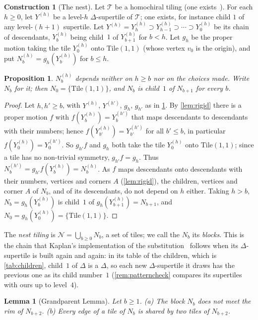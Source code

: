 \documentclass[11pt]{amsart}
\newtheorem{lemma}[theorem]{Lemma}
\newtheorem{proposition}[theorem]{Proposition}
\theoremstyle{definition}
\newtheorem{construction}[theorem]{Construction}
\theoremstyle{remark}
\newcommand{\Tile}{\mathrm{Tile}(1,1)}
\newcommand{\T}{\mathcal T}
\newcommand{\N}{\mathcal N}
\begin{document}
\begin{construction}[The nest]\label{con:nest}
Let $\T$ be a homochiral tiling (one exists~\cite[Thm.~2.2]{SMKGS-spectre}). For each $h\ge0$, let $Y^{(h)}$ be a
level-$h$ $\Delta$-supertile of $\T$; one exists, for instance child $1$ of any level-$(h+1)$ supertile. Let
$Y^{(h)}=Y^{(h)}_h\supset Y^{(h)}_{h-1}\supset\cdots\supset Y^{(h)}_0$ be its chain of descendants, $Y^{(h)}_b$ being
child~$1$ of $Y^{(h)}_{b+1}$ for $b<h$. Let $g_h$ be the proper motion taking the tile $Y^{(h)}_0$ onto $\Tile$ (whose
vertex $v_0$ is the origin), and put $N^{(h)}_b=g_h(Y^{(h)}_b)$ for $b\le h$.
\end{construction}

\begin{proposition}\label{prop:nestwell}
$N^{(h)}_b$ depends neither on $h\ge b$ nor on the choices made. Write $N_b$ for it; then $N_0=\{\Tile\}$, and $N_b$ is
child~$1$ of $N_{b+1}$ for every $b$.
\end{proposition}

\begin{proof}
Let $h,h'\ge b$, with $Y^{(h)}$, $Y^{(h')}$, $g_h$, $g_{h'}$ as in \cref{con:nest}. By \cref{lem:rigid} there is a
proper motion $f$ with $f(Y^{(h)}_b)=Y^{(h')}_b$ that maps descendants to descendants with their numbers; hence
$f(Y^{(h)}_{b'})=Y^{(h')}_{b'}$ for all $b'\le b$, in particular $f(Y^{(h)}_0)=Y^{(h')}_0$. So $g_{h'}f$ and $g_h$ both
take the tile $Y^{(h)}_0$ onto $\Tile$; since a tile has no non-trivial symmetry, $g_{h'}f=g_h$. Thus
$N^{(h')}_b=g_{h'}f(Y^{(h)}_b)=N^{(h)}_b$. As $f$ maps descendants onto descendants with their numbers, vertices and
corners $A$ (\cref{lem:rigid}), the children, vertices and corner $A$ of $N_b$, and of its descendants, do not depend on
$h$ either. Taking $h>b$, $N_b=g_h(Y^{(h)}_b)$ is child~$1$ of $g_h(Y^{(h)}_{b+1})=N_{b+1}$, and
$N_0=g_h(Y^{(h)}_0)=\{\Tile\}$.
\end{proof}

The \emph{nest tiling} is $\N=\bigcup_{b\ge0}N_b$, a set of tiles; we call the $N_b$ its \emph{blocks}.
This is the chain that Kaplan's implementation of the substitution~\cite{KaplanSpectrePage} follows when its
$\Delta$-supertile is built again and again: in its table of the children, which is \cref{tab:children}, child~$1$ of
$\Delta$ is a $\Delta$, so each new $\Delta$-supertile it draws has the previous one as its child number~$1$
(\cref{rem:patterncheck} compares its supertiles with ours up to level~$4$).

\begin{lemma}[Grandparent Lemma]\label{lem:gap}
Let $b\ge1$. \textup{(a)} The block $N_b$ does not meet the rim of $N_{b+2}$. \textup{(b)} Every edge of a tile of
$N_b$ is shared by two tiles of $N_{b+2}$.
\end{lemma}
\end{document}
